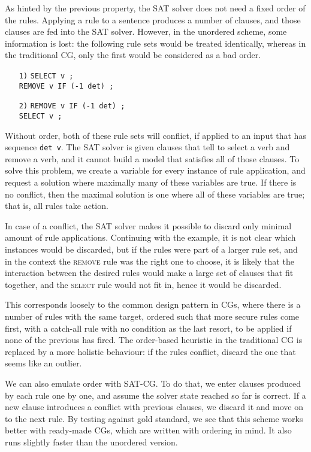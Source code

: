 As hinted by the previous property, the SAT solver does not need a fixed
order of the rules.
Applying a rule to a sentence produces a number of clauses,
and those clauses are fed into the SAT solver.
However, in the unordered scheme, some information is lost: the
following rule sets would be treated identically, whereas in the
traditional CG, only the first would be considered as a bad order.

\begin{itemize}
\item [\texttt{1)}] \texttt{SELECT v ;} \\
         \texttt{REMOVE v IF (-1 det) ;} 
\item [\texttt{2)}] \texttt{REMOVE v IF (-1 det) ;} \\
         \texttt{SELECT v ;}
\end{itemize}

Without order, both of these rule sets will conflict, if applied to an
input that has sequence \texttt{det v}.
The SAT solver is given clauses that tell to select a verb and remove a
verb, and it cannot build a model that satisfies all of those clauses.
To solve this problem, we create a variable for every instance of rule application, and request a solution where maximally many of these variables are true.
If there is no conflict, then the maximal solution is one where all of
these variables are true; that is, all rules take action.


In case of a conflict, the SAT solver makes it possible to discard only
minimal amount of rule applications. Continuing with the example,
it is not clear which instances would be discarded, but if the rules
were part of a larger rule set, and in the context the \textsc{remove} rule was
the right one to choose, it is likely that the interaction between the desired
rules would make a large set of clauses that fit together, and the
\textsc{select} rule would not fit in, hence it would be discarded. 

This corresponds loosely to the common design pattern in
CGs, where there is a number of rules with the same target, ordered
such that more secure rules come first,
with a catch-all rule with no condition as the last resort, to be
applied if none of the previous has fired.
The order-based heuristic in the traditional CG is replaced by a more
holistic behaviour: if the rules conflict, discard the one that seems
like an outlier.


We can also emulate order with SAT-CG. To do that, we enter clauses
produced by each rule one by one, and assume the solver state reached
so far is correct. If a new clause introduces a conflict with
previous clauses, we discard it and move on to the next rule.
By testing against gold standard, we see that this scheme works better
with ready-made CGs, which are written with ordering in mind.
It also runs slightly faster than the unordered version.
\\




